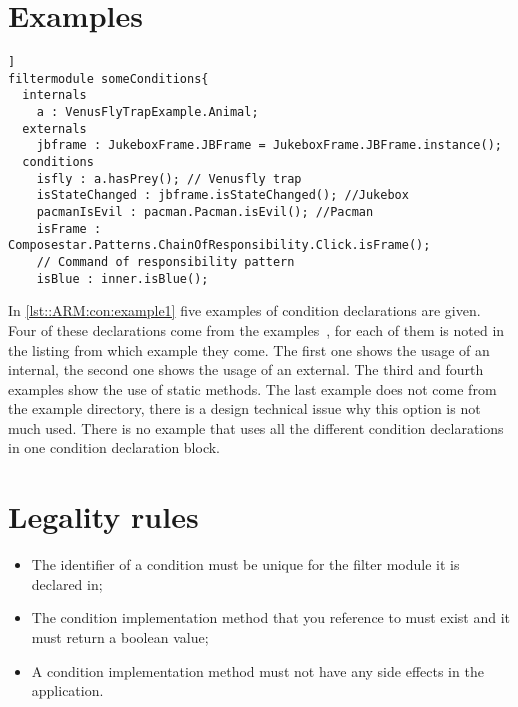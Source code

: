 \section*{Examples}
\begin{lstlisting}[caption={Some condition declarations combined},label=lst::ARM:con:example1,style=listing,language=ComposeStar,float=[tpb]]
filtermodule someConditions{
  internals
    a : VenusFlyTrapExample.Animal;
  externals
    jbframe : JukeboxFrame.JBFrame = JukeboxFrame.JBFrame.instance();
  conditions
    isfly : a.hasPrey(); // Venusfly trap
    isStateChanged : jbframe.isStateChanged(); //Jukebox
    pacmanIsEvil : pacman.Pacman.isEvil(); //Pacman
    isFrame : Composestar.Patterns.ChainOfResponsibility.Click.isFrame();
    // Command of responsibility pattern
    isBlue : inner.isBlue();
\end{lstlisting}
In \autoref{lst::ARM:con:example1} five examples of condition declarations are given. Four of these declarations come from the \Compose* examples~\cite{Composestar}, for each of them is noted in the listing from which example they come. 
The first one shows the usage of an internal, the second one shows the usage of an external.
The third and fourth examples show the use of static methods.
The last example does not come from the example directory, there is a design technical issue why this option is not much used.
There is no example that uses all the different condition declarations in one condition declaration block.

\section*{Legality rules}
\begin{itemize}[noitemsep]
\item The identifier of a condition must be unique for the filter module it is declared in;
\item The condition implementation method that you reference to must exist and it must return a boolean value;
\item A condition implementation method must not have any side effects in the application.
\end{itemize}


\comments{}
